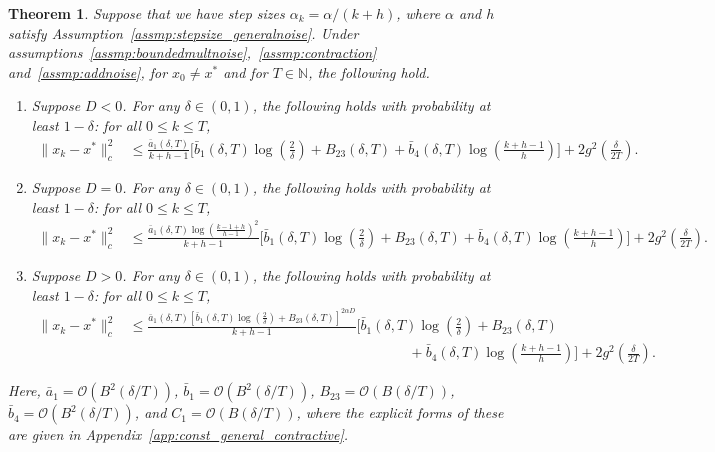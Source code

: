 \documentclass{article}
\newcommand{\lrp}[1]{\left( #1 \right)}
\newcommand{\lrs}[1]{\left[ #1 \right]}
\newcommand{\N}{\mathbb{N}}
\newtheorem{theorem}{Theorem}[section]
\begin{document}
\begin{theorem}\label{th:generalnoiseconc}
    Suppose that we have step sizes $\alpha_k=\alpha/(k+h)$, where $\alpha$ and $h$ satisfy Assumption~\ref{assmp:stepsize_generalnoise}. Under assumptions~\ref{assmp:boundedmultnoise},~\ref{assmp:contraction} and~\ref{assmp:addnoise}, for $x_0 \ne x^*$ and for $T\in \N$, the following hold. 
    \begin{enumerate}
        \item Suppose $D < 0$. For any $\delta\in(0,1)$, the following holds with probability at least $1-\delta$: for all $0 \le k\le T$,   
        \begin{align*}
            \| x_k - x^*\|^2_c 
            &\leq \frac{\bar{a}_1(\delta, T)}{k+h-1} \bigg[\bar{b}_1(\delta, T)\log\left(\tfrac{2}{\delta}\right) + B_{23}(\delta, T) + \bar{b}_4(\delta, T) \log\left(\tfrac{k+h-1}{h}\right)\bigg]  + 2 g^2\lrp{\tfrac{\delta}{2T}}.
        \end{align*}
        \item Suppose $D = 0$. For any $\delta\in(0,1)$, the following holds with probability at least $1-\delta$: for all $0 \le k\le T$,   
        \begin{align*}
            \| x_k - x^*\|^2_c 
            &\leq \frac{\bar{a}_1(\delta,T) \log(\tfrac{k-1+h}{h-1})^2}{k+h-1} \bigg[\bar{b}_1(\delta, T)\log\left(\tfrac{2}{\delta}\right) + {B}_{23}(\delta, T)  + \bar{b}_4(\delta, T) \log(\tfrac{k+h-1}{h})\bigg] + 2 g^2\lrp{\tfrac{\delta}{2T}}.
        \end{align*}
        \item Suppose $D > 0$. For any $\delta \in (0,1)$, the following holds with probability at least $1-\delta$: for all $0 \le k \le T$, 
        \begin{align*}
            \| x_k - x^*\|^2_c 
            &\leq \frac{\bar{a}_1(\delta, T) \lrs{\bar{b}_1(\delta, T)\log\left(\tfrac{2}{\delta}\right) + B_{23}(\delta, T)}^{2\alpha  D}}{k+h-1} \bigg[\bar{b}_1(\delta, T)\log\left(\tfrac{2}{\delta}\right)   + B_{23}(\delta, T) \\ 
            &\qquad \qquad \qquad \qquad \qquad \qquad \qquad \qquad \qquad \qquad + \bar{b}_4(\delta, T) \log(\tfrac{k+h-1}{h})\bigg]  + 2 g^2\lrp{\tfrac{\delta}{2T}}.
        \end{align*}
    \end{enumerate}
    {Here, $\bar{a}_1= \mathcal O(B^2(\delta/T))$, $\bar{b}_1=\mathcal O(B^2(\delta/T))$, $B_{23}=\mathcal O(B(\delta/T))$, $\bar{b}_4=\mathcal O(B^2(\delta/T))$, and $C_1=\mathcal O(B(\delta/T))$, where the explicit forms of these are given in Appendix~\ref{app:const_general_contractive}.}
\end{theorem}
\end{document}
